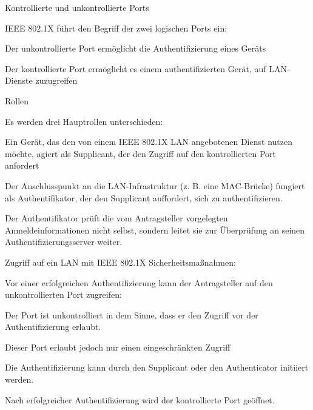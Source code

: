 \documentclass[a4paper]{article}
\begin{document}
\begin{multicols}{3}
      Kontrollierte und unkontrollierte Ports
      \begin{itemize*}
            \item IEEE 802.1X führt den Begriff der zwei logischen Ports ein:
            \item Der unkontrollierte Port ermöglicht die Authentifizierung eines Geräts
            \item Der kontrollierte Port ermöglicht es einem authentifizierten Gerät, auf LAN-Dienste zuzugreifen
      \end{itemize*}

      Rollen
      \begin{itemize*}
            \item Es werden drei Hauptrollen unterschieden:
            \begin{itemize*}
                  \item Ein Gerät, das den von einem IEEE 802.1X LAN angebotenen Dienst nutzen möchte, agiert als Supplicant, der den Zugriff auf den kontrollierten Port anfordert
                  \item Der Anschlusspunkt an die LAN-Infrastruktur (z. B. eine MAC-Brücke) fungiert als Authentifikator, der den Supplicant auffordert, sich zu authentifizieren.
                  \item Der Authentifikator prüft die vom Antragsteller vorgelegten Anmeldeinformationen nicht selbst, sondern leitet sie zur Überprüfung an seinen Authentifizierungsserver weiter.
            \end{itemize*}
            \item Zugriff auf ein LAN mit IEEE 802.1X Sicherheitsmaßnahmen:
            \begin{itemize*}
                  \item Vor einer erfolgreichen Authentifizierung kann der Antragsteller auf den unkontrollierten Port zugreifen:
                  \item Der Port ist unkontrolliert in dem Sinne, dass er den Zugriff vor der Authentifizierung erlaubt.
                  \item Dieser Port erlaubt jedoch nur einen eingeschränkten Zugriff
                  \item Die Authentifizierung kann durch den Supplicant oder den Authenticator initiiert werden.
                  \item Nach erfolgreicher Authentifizierung wird der kontrollierte Port geöffnet.
            \end{itemize*}
      \end{itemize*}


\end{multicols}
\end{document}
